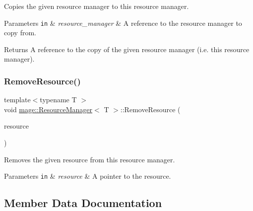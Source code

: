 Copies the given resource manager to this resource manager.


\begin{DoxyParams}[1]{Parameters}
\mbox{\tt in}  & {\em resource\+\_\+manager} & A reference to the resource manager to copy from. \\
\hline
\end{DoxyParams}
\begin{DoxyReturn}{Returns}
A reference to the copy of the given resource manager (i.\+e. this resource manager). 
\end{DoxyReturn}
\hypertarget{classmage_1_1_resource_manager_ac557e5047590d0403291557c88966574}{}\label{classmage_1_1_resource_manager_ac557e5047590d0403291557c88966574} 
\subsubsection{\texorpdfstring{Remove\+Resource()}{RemoveResource()}}
{\footnotesize\ttfamily template$<$typename T $>$ \\
void \hyperlink{classmage_1_1_resource_manager}{mage\+::\+Resource\+Manager}$<$ T $>$\+::Remove\+Resource (\begin{DoxyParamCaption}\item[{\hyperlink{namespacemage_a1e01ae66713838a7a67d30e44c67703e}{Shared\+Ptr}$<$ T $>$}]{resource }\end{DoxyParamCaption})}

Removes the given resource from this resource manager.


\begin{DoxyParams}[1]{Parameters}
\mbox{\tt in}  & {\em resource} & A pointer to the resource. \\
\hline
\end{DoxyParams}


\subsection{Member Data Documentation}
\hypertarget{classmage_1_1_resource_manager_a41d5a40aeaef12e2ecef0cb8f5f4a4d5}{}\label{classmage_1_1_resource_manager_a41d5a40aeaef12e2ecef0cb8f5f4a4d5} 
